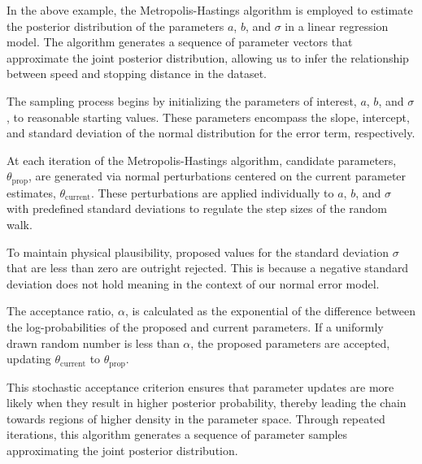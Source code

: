 In the above example, the Metropolis-Hastings algorithm is employed to estimate the posterior distribution of the parameters \( a \), \( b \), and \( \sigma \) in a linear regression model. The algorithm generates a sequence of parameter vectors that approximate the joint posterior distribution, allowing us to infer the relationship between speed and stopping distance in the dataset.

The sampling process begins by initializing the parameters of interest, \( a \), \( b \), and \( \sigma \), to reasonable starting values. These parameters encompass the slope, intercept, and standard deviation of the normal distribution for the error term, respectively.

At each iteration of the Metropolis-Hastings algorithm, candidate parameters, \( \theta_{\text{prop}} \), are generated via normal perturbations centered on the current parameter estimates, \( \theta_{\text{current}} \). These perturbations are applied individually to \( a \), \( b \), and \( \sigma \) with predefined standard deviations to regulate the step sizes of the random walk.

To maintain physical plausibility, proposed values for the standard deviation \( \sigma \) that are less than zero are outright rejected. This is because a negative standard deviation does not hold meaning in the context of our normal error model.


The acceptance ratio, \( \alpha \), is calculated as the exponential of the difference between the log-probabilities of the proposed and current parameters. If a uniformly drawn random number is less than \( \alpha \), the proposed parameters are accepted, updating \( \theta_{\text{current}} \) to \( \theta_{\text{prop}} \).

This stochastic acceptance criterion ensures that parameter updates are more likely when they result in higher posterior probability, thereby leading the chain towards regions of higher density in the parameter space. Through repeated iterations, this algorithm generates a sequence of parameter samples approximating the joint posterior distribution.

